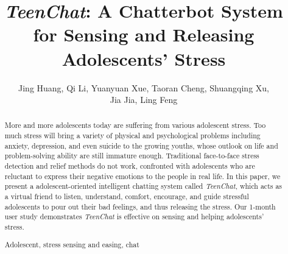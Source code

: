 \documentclass[runningheads,a4paper]{llncs}
\newcommand{\keywords}[1]{\par\addvspace\baselineskip
\noindent\keywordname\enspace\ignorespaces#1}
\begin{document}
\mainmatter

\title{\emph{TeenChat}: A Chatterbot System for Sensing and Releasing Adolescents' Stress}
\author{Jing Huang, Qi Li, Yuanyuan Xue, Taoran Cheng, Shuangqing Xu, \\Jia Jia, Ling Feng}
\maketitle
\begin{abstract}
More and more adolescents today are suffering from various adolescent stress.
Too much stress will bring a variety of physical and psychological problems
including anxiety, depression, and even suicide to the growing youths, whose
outlook on life and problem-solving ability are still immature enough.
Traditional face-to-face stress detection and relief methods do not work, confronted with adolescents who are reluctant
to express their negative emotions to the people in real life.
In this paper, we present a adolescent-oriented intelligent chatting system called \emph{TeenChat}, which acts as a virtual friend
to listen, understand, comfort, encourage, and guide stressful adolescents to pour out their bad feelings, and
thus releasing the stress. Our 1-month user study demonstrates \emph{TeenChat} is effective on sensing and helping adolescents' stress.
\keywords{Adolescent, stress sensing and easing, chat}
\end{abstract}










\footnotesize

\end{document}
